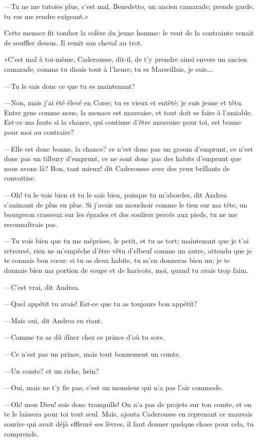 —Tu ne me tutoies plus, c'est mal, Benedetto, un ancien camarade; prends garde, tu vas me rendre exigeant.» 

Cette menace fit tomber la colère du jeune homme: le vent de la contrainte venait de souffler dessus. Il remit son cheval au trot. 

«C'est mal à toi-même, Caderousse, dit-il, de t'y prendre ainsi envers un ancien camarade, comme tu disais tout à l'heure; tu es Marseillais, je suis\dots. 

—Tu le sais donc ce que tu es maintenant? 

—Non, mais j'ai été élevé en Corse; tu es vieux et entêté; je suis jeune et têtu. Entre gens comme nous, la menace est mauvaise, et tout doit se faire à l'amiable. Est-ce ma faute si la chance, qui continue d'être mauvaise pour toi, est bonne pour moi au contraire? 

—Elle est donc bonne, la chance? ce n'est donc pas un groom d'emprunt, ce n'est donc pas un tilbury d'emprunt, ce ne sont donc pas des habits d'emprunt que nous avons là? Bon, tant mieux! dit Caderousse avec des yeux brillants de convoitise. 

—Oh! tu le vois bien et tu le sais bien, puisque tu m'abordes, dit Andrea s'animant de plus en plus. Si j'avais un mouchoir comme le tien sur ma tête, un bourgeron crasseux sur les épaules et des souliers percés aux pieds, tu ne me reconnaîtrais pas. 

—Tu vois bien que tu me méprises, le petit, et tu as tort; maintenant que je t'ai retrouvé, rien ne m'empêche d'être vêtu d'elbeuf comme un autre, attendu que je te connais bon cœur: si tu as deux habits, tu m'en donneras bien un; je te donnais bien ma portion de soupe et de haricots, moi, quand tu avais trop faim. 

—C'est vrai, dit Andrea. 

—Quel appétit tu avais! Est-ce que tu as toujours bon appétit? 

—Mais oui, dit Andrea en riant. 

—Comme tu as dû dîner chez ce prince d'où tu sors. 

—Ce n'est pas un prince, mais tout bonnement un comte. 

—Un comte? et un riche, hein? 

—Oui, mais ne t'y fie pas; c'est un monsieur qui n'a pas l'air commode. 

—Oh! mon Dieu! sois donc tranquille! On n'a pas de projets sur ton comte, et on te le laissera pour toi tout seul. Mais, ajouta Caderousse en reprenant ce mauvais sourire qui avait déjà effleuré ses lèvres, il faut donner quelque chose pour cela, tu comprends. 

